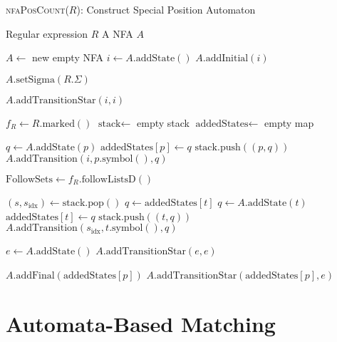 \begin{algorithm}[H]
\caption{\textsc{nfaPosCount}($R$): Construct Special Position Automaton}
\label{alg:nfaPosCount}
\begin{small}
\begin{algorithmic}[1]
\Require Regular expression $R$
\Ensure A NFA $A$

\State $A \gets$ new empty NFA
\State $i \gets A.\text{addState}()$
\State $A.\text{addInitial}(i)$

    \State $A.\text{setSigma}(R.\Sigma)$
\EndIf

\State $A.\text{addTransitionStar}(i, i)$ 

\State $f_R \gets R.\text{marked}()$
\State $\text{stack} \gets$ empty stack
\State $\text{addedStates} \gets$ empty map

    \State $q \gets A.\text{addState}(p)$
    \State $\text{addedStates}[p] \gets q$
    \State $\text{stack}.\text{push}((p, q))$
    \State $A.\text{addTransition}(i, p.\text{symbol}(), q)$
\EndFor

\State $\text{FollowSets} \gets f_R.\text{followListsD}()$

    \State $(s, s_{\text{idx}}) \gets \text{stack}.\text{pop}()$
            \State $q \gets \text{addedStates}[t]$
        \Else
            \State $q \gets A.\text{addState}(t)$
            \State $\text{addedStates}[t] \gets q$
            \State $\text{stack}.\text{push}((t, q))$
        \EndIf
        \State $A.\text{addTransition}(s_{\text{idx}}, t.\text{symbol}(), q)$
    \EndFor
\EndWhile

\State $e \gets A.\text{addState}()$
\State $A.\text{addTransitionStar}(e, e)$

        \State $A.\text{addFinal}(\text{addedStates}[p])$
        \State $A.\text{addTransitionStar}(\text{addedStates}[p], e)$
    \EndIf
\EndFor

\end{algorithmic}
\end{small}
\end{algorithm}

\section{Automata-Based Matching}

